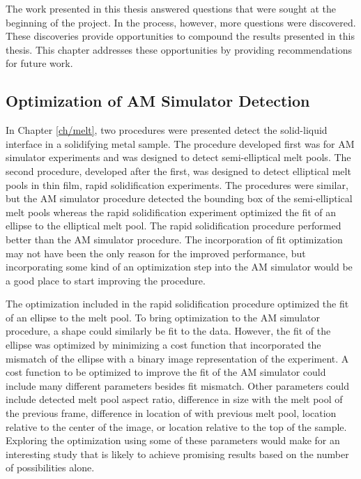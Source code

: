 The work presented in this thesis answered questions that were sought at
the beginning of the project. In the process, however, more questions
were discovered. These discoveries provide opportunities
to compound the results presented in this thesis.
This chapter addresses these opportunities by providing 
recommendations for future work. 

\subsection{Optimization of AM Simulator Detection}
In Chapter \ref{ch/melt}, two procedures were presented detect the
solid-liquid interface in a solidifying metal sample. The procedure
developed first was for AM simulator experiments and was designed to
detect semi-elliptical melt pools. The second procedure,
developed after the first, was designed to detect elliptical melt pools in
thin film, rapid solidification experiments.
The procedures were similar, but the AM simulator procedure detected the
bounding box of the semi-elliptical melt pools whereas the rapid
solidification experiment optimized the fit of an ellipse to the
elliptical melt pool. The rapid solidification procedure performed better
than the AM simulator procedure. The incorporation of fit optimization may
not have been the only reason for the improved performance, but
incorporating some kind of an optimization step into the AM simulator
would be a good place to start improving the procedure.

The optimization included in the rapid solidification procedure optimized
the fit of an ellipse to the melt pool. To bring optimization to the AM
simulator procedure, a shape could similarly be fit to the data. However,
the fit of the ellipse was optimized by minimizing a cost function that
incorporated the mismatch of the ellipse with a binary image
representation of the experiment. A cost function to be optimized to
improve the fit of the AM simulator could include many different
parameters besides fit mismatch. Other parameters could
include detected melt pool aspect ratio, difference in size
with the melt pool of the previous frame, difference in location of
with previous melt pool, location relative to the center of the image,
or location relative to the top of the sample.
Exploring the optimization using some of these parameters would make for
an interesting study that is likely to achieve promising results based
on the number of possibilities alone.

